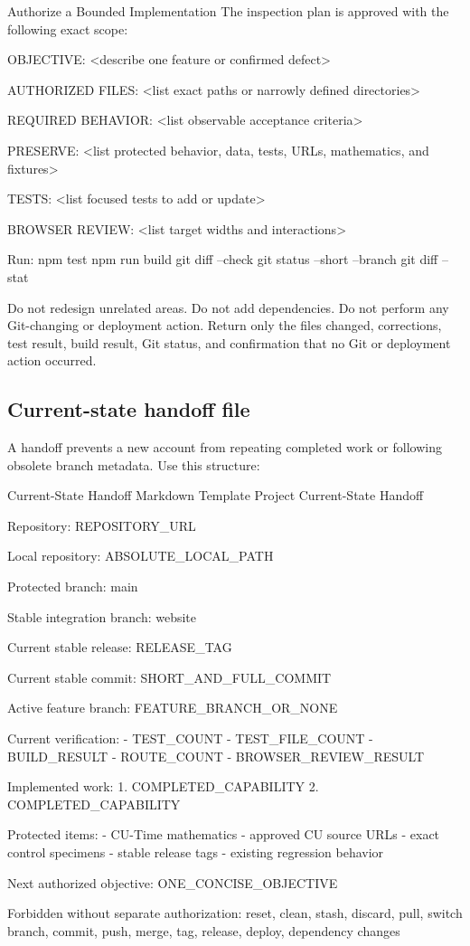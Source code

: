 \documentclass[11pt,letterpaper]{article}
\begin{document}
\begin{promptbox}{Authorize a Bounded Implementation}
The inspection plan is approved with the following exact scope:

OBJECTIVE:
<describe one feature or confirmed defect>

AUTHORIZED FILES:
<list exact paths or narrowly defined directories>

REQUIRED BEHAVIOR:
<list observable acceptance criteria>

PRESERVE:
<list protected behavior, data, tests, URLs, mathematics, and fixtures>

TESTS:
<list focused tests to add or update>

BROWSER REVIEW:
<list target widths and interactions>

Run:
npm test
npm run build
git diff --check
git status --short --branch
git diff --stat

Do not redesign unrelated areas.
Do not add dependencies.
Do not perform any Git-changing or deployment action.
Return only the files changed, corrections, test result, build result,
Git status, and confirmation that no Git or deployment action occurred.
\end{promptbox}

\subsection{Current-state handoff file}

A handoff prevents a new account from repeating completed work or following
obsolete branch metadata. Use this structure:

\begin{codebox}{Current-State Handoff Markdown Template}
Project Current-State Handoff

Repository:
REPOSITORY_URL

Local repository:
ABSOLUTE_LOCAL_PATH

Protected branch:
main

Stable integration branch:
website

Current stable release:
RELEASE_TAG

Current stable commit:
SHORT_AND_FULL_COMMIT

Active feature branch:
FEATURE_BRANCH_OR_NONE

Current verification:
- TEST_COUNT
- TEST_FILE_COUNT
- BUILD_RESULT
- ROUTE_COUNT
- BROWSER_REVIEW_RESULT

Implemented work:
1. COMPLETED_CAPABILITY
2. COMPLETED_CAPABILITY

Protected items:
- CU-Time mathematics
- approved CU source URLs
- exact control specimens
- stable release tags
- existing regression behavior

Next authorized objective:
ONE_CONCISE_OBJECTIVE

Forbidden without separate authorization:
reset, clean, stash, discard, pull, switch branch, commit, push,
merge, tag, release, deploy, dependency changes
\end{codebox}
\end{document}
